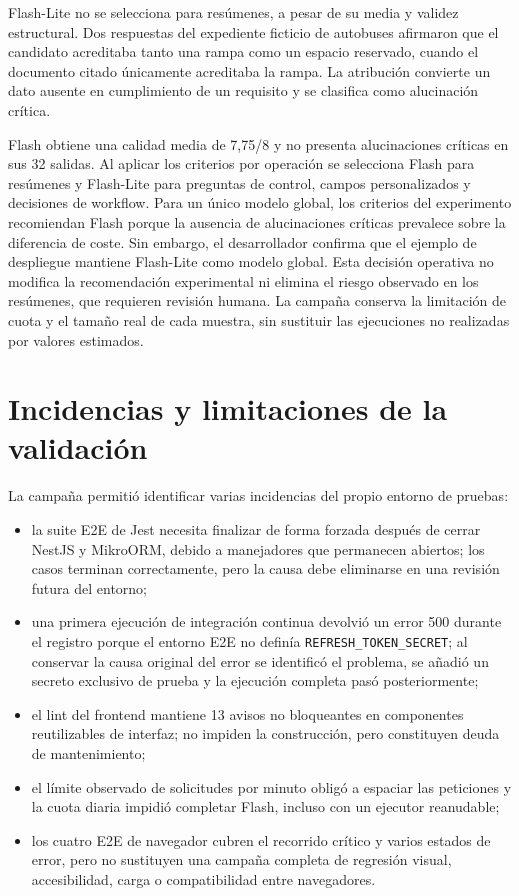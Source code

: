 Flash-Lite no se selecciona para resúmenes, a pesar de su media y validez
estructural. Dos respuestas del expediente ficticio de autobuses afirmaron que
el candidato acreditaba tanto una rampa como un espacio reservado, cuando el
documento citado únicamente acreditaba la rampa. La atribución convierte un
dato ausente en cumplimiento de un requisito y se clasifica como alucinación
crítica.

Flash obtiene una calidad media de 7,75/8 y no presenta alucinaciones críticas
en sus 32 salidas. Al aplicar los criterios por operación se selecciona Flash
para resúmenes y Flash-Lite para preguntas de control, campos personalizados y
decisiones de workflow. Para un único modelo global, los criterios del
experimento recomiendan Flash porque la ausencia de alucinaciones críticas
prevalece sobre la diferencia de coste. Sin embargo, el desarrollador confirma
que el ejemplo de despliegue mantiene Flash-Lite como modelo global. Esta
decisión operativa no modifica la recomendación experimental ni elimina el
riesgo observado en los resúmenes, que requieren revisión humana.
La campaña conserva la limitación de cuota y el tamaño
real de cada muestra, sin sustituir las ejecuciones no realizadas por valores
estimados.

\section{Incidencias y limitaciones de la validación}
\label{sec:testing-limitations}

La campaña permitió identificar varias incidencias del propio entorno de
pruebas:

\begin{itemize}
  \item la suite E2E de Jest necesita finalizar de forma forzada después de
  cerrar NestJS y MikroORM, debido a manejadores que permanecen abiertos; los
  casos terminan correctamente, pero la causa debe eliminarse en una revisión
  futura del entorno;
  \item una primera ejecución de integración continua devolvió un error 500
  durante el registro porque el entorno E2E no definía
  \texttt{REFRESH\_TOKEN\_SECRET}; al conservar la causa original del error se
  identificó el problema, se añadió un secreto exclusivo de prueba y la
  ejecución completa pasó posteriormente;
  \item el lint del frontend mantiene 13 avisos no bloqueantes en componentes
  reutilizables de interfaz; no impiden la construcción, pero constituyen deuda
  de mantenimiento;
  \item el límite observado de solicitudes por minuto obligó a espaciar las
  peticiones y la cuota diaria impidió completar Flash, incluso con un ejecutor
  reanudable;
  \item los cuatro E2E de navegador cubren el recorrido crítico y varios estados
  de error, pero no sustituyen una campaña completa de regresión visual,
  accesibilidad, carga o compatibilidad entre navegadores.
\end{itemize}


